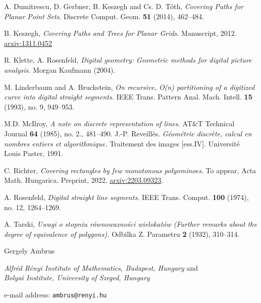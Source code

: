 \documentclass[11pt,a4paper]{amsart}
\begin{document}
\begin{thebibliography}{999999999}

 A. Dumitrescu, D. Gerbner, B. Keszegh and Cs. D. Tóth, {\em Covering Paths for Planar Point Sets}. Discrete Comput. Geom. {\bf  51} (2014), 462--484.

 B. Keszegh, {\em Covering Paths and Trees for Planar Grids}. Manuscript, 2012.  \href{https://arxiv.org/abs/1311.0452}{arxiv:1311.0452}

R. Klette, A. Rosenfeld, {\em Digital geometry: Geometric methods for digital picture analysis}. Morgan Kaufmann (2004).

 M. Linderbaum and A. Bruckstein, {\em On recursive, O(n) partitioning of a digitized curve into digital straight segments.} IEEE Trans. Pattern Anal. Mach. Intell. {\bf 15} (1993), no. 9, 949--953.

 M.D. McIlroy, {\em A note on discrete representation of lines.} AT\&T Technical Journal {\bf 64} (1985), no. 2.,  481--490.
 J.-P. Reveillès. {\em Géométrie discrète, calcul en nombres entiers et algorithmique.}  Traitement des images [ess.IV]. Université Louis Paster, 1991.


 C. Richter, {\em Covering rectangles by few monotonous polyominoes}. To appear,  Acta Math. Hungarica. Preprint, 2022. \href{https://aps.arxiv.org/abs/2203.09323}{arxiv:2203.09323}.
 
 A. Rosenfeld, {\em Digital straight line segments.} IEEE Trans. Comput. {\bf 100} (1974), no. 12,  1264--1269.

 A. Tarski, {\em Uwagi o stopniu r\'ownowazno\'{s}ci wielokat\'{o}w (Further remarks about
the degree of equivalence of polygons).} Odbilka Z. Parametru {\bf 2} (1932), 310--314.
\end{thebibliography}


\bigskip

\noindent
{\sc Gergely Ambrus}
\smallskip

\noindent
{\em Alfréd Rényi Institute of Mathematics, Budapest, Hungary} and\\ {\em Bolyai Institute, University of Szeged, Hungary}
\smallskip

\noindent
e-mail address: \texttt{ambrus@renyi.hu}

\bigskip
\end{document}
